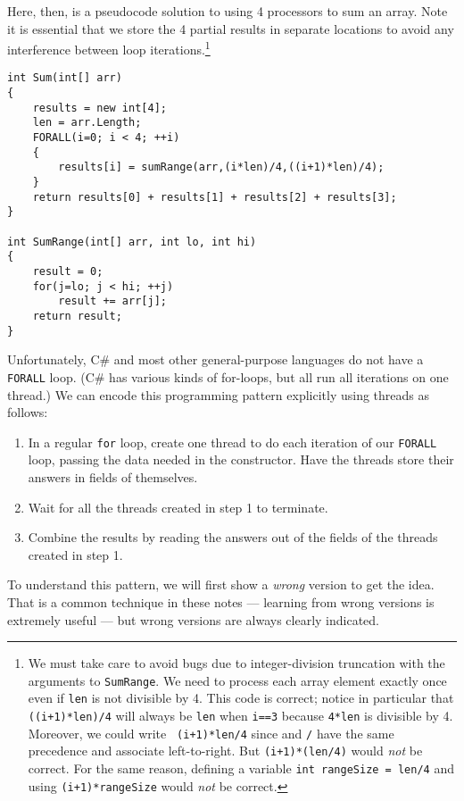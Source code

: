 \documentclass[10pt]{article}
\begin{document}
Here, then, is a pseudocode solution to using 4 processors to sum an
array.  Note it is essential that we store the 4 partial results in
separate locations to avoid any interference between loop
iterations.\footnote{We must take care to avoid bugs due to
  integer-division truncation with the arguments to {\tt SumRange}.
  We need to process each array element exactly once even if {\tt len} is
  not divisible by 4.  This code is correct; notice in particular that
  {\tt ((i+1)*len)/4} will always be {\tt len} when {\tt i==3} because
  {\tt 4*len} is divisible by 4.  Moreover, we could write {\tt
    (i+1)*len/4} since {\tt *} and {\tt /} have the same precedence
  and associate left-to-right.  But {\tt (i+1)*(len/4)} would
  \emph{not} be correct.  For the same reason, defining a variable
  {\tt int rangeSize = len/4} and using {\tt (i+1)*rangeSize} would
  \emph{not} be correct.}
\goodbreak
\begin{verbatim}
int Sum(int[] arr)
{
    results = new int[4];
    len = arr.Length;
    FORALL(i=0; i < 4; ++i)
    {
        results[i] = sumRange(arr,(i*len)/4,((i+1)*len)/4);
    }
    return results[0] + results[1] + results[2] + results[3];
}

int SumRange(int[] arr, int lo, int hi)
{
    result = 0;
    for(j=lo; j < hi; ++j)
        result += arr[j];
    return result;
}
\end{verbatim}

Unfortunately, C\# and most other general-purpose languages do not
have a {\tt FORALL} loop.  (C\# has various kinds of for-loops, but
all run all iterations on one thread.)  We can encode this programming pattern
explicitly using threads as follows:
\begin{enumerate}
\item In a regular {\tt for} loop, create one thread to do each
  iteration of our {\tt FORALL} loop, passing the data needed in the
  constructor.  Have the threads store their answers in fields of
  themselves.
\item Wait for all the threads created in step 1 to
  terminate.
\item Combine the results by reading the answers out of the fields of
  the threads created in step 1.
\end{enumerate}

To understand this pattern, we will first show a \emph{wrong}
version to get the idea.  That is a common technique in these notes
--- learning from wrong versions is extremely useful --- but wrong
versions are always clearly indicated.
\end{document}
